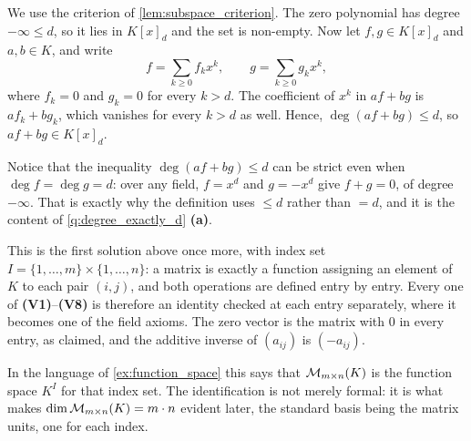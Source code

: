 \begin{exercisesolution}
\label{sol:bounded_degree_subspace}
We use the criterion of \cref{lem:subspace_criterion}. The zero polynomial has degree $-\infty \le d$, so it lies in $K[x]_d$ and the set is non-empty. Now let $f, g \in K[x]_d$ and $a, b \in K$, and write
\[
    f = \sum_{k \ge 0} f_k x^k, \qquad g = \sum_{k \ge 0} g_k x^k,
\]
where $f_k = 0$ and $g_k = 0$ for every $k > d$. The coefficient of $x^k$ in $a f + b g$ is $a f_k + b g_k$, which vanishes for every $k > d$ as well. Hence, $\deg(a f + b g) \le d$, so $a f + b g \in K[x]_d$.

Notice that the inequality $\deg(a f + b g) \le d$ can be strict even when $\deg f = \deg g = d$: over any field, $f = x^d$ and $g = -x^d$ give $f + g = 0$, of degree $-\infty$. That is exactly why the definition uses $\le d$ rather than $= d$, and it is the content of \cref{q:degree_exactly_d} \textbf{(a)}.
\end{exercisesolution}

\begin{exercisesolution}
\label{sol:matrix_space}
This is the first solution above once more, with index set $I = \{1, \dots, m\} \times \{1, \dots, n\}$: a matrix is exactly a function assigning an element of $K$ to each pair $(i,j)$, and both operations are defined entry by entry. Every one of \textbf{(V1)}--\textbf{(V8)} is therefore an identity checked at each entry separately, where it becomes one of the field axioms. The zero vector is the matrix with $0$ in every entry, as claimed, and the additive inverse of $(a_{ij})$ is $(-a_{ij})$.

In the language of \cref{ex:function_space} this says that $\mathcal{M}_{m \times n}(K)$ is the function space $K^{I}$ for that index set. The identification is not merely formal: it is what makes $\dim \mathcal{M}_{m \times n}(K) = m \cdot n$ evident later, the standard basis being the matrix units, one for each index.
\end{exercisesolution}

